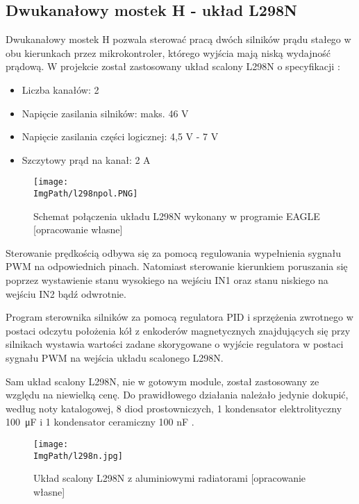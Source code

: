\documentclass[a4paper,12pt,twoside,openany]{report}
\newcommand{\ImgPath}{.}
\begin{document}
\newpage

\subsection{Dwukanałowy mostek H - układ L298N}

Dwukanałowy mostek H pozwala sterować pracą dwóch silników prądu stałego w obu kierunkach przez mikrokontroler, którego wyjścia mają niską wydajność prądową. W projekcie został zastosowany układ scalony L298N o specyfikacji \cite{l298n}:
\begin{itemize}
\item Liczba kanałów: 2
\item Napięcie zasilania silników: maks. 46 V
\item Napięcie zasilania części logicznej: 4,5 V - 7 V
\item Szczytowy prąd na kanał: 2 A
\end{itemize}

\begin{figure}[!htbp]
	\begin{center}
\centering
\texttt{[image: \\ImgPath/l298npol.PNG]}
\end{center}
	\caption{Schemat połączenia układu L298N wykonany w programie EAGLE [opracowanie własne]}
	\label{schematKomunikacji}
\end{figure}

Sterowanie prędkością odbywa się za pomocą regulowania wypełnienia sygnału PWM na odpowiednich pinach. Natomiast sterowanie kierunkiem poruszania się poprzez wystawienie stanu wysokiego na wejściu IN1 oraz stanu niskiego na wejściu IN2 bądź odwrotnie.

Program sterownika silników za pomocą regulatora PID i sprzężenia zwrotnego w postaci odczytu położenia kół z enkoderów magnetycznych znajdujących się przy silnikach wystawia wartości zadane skorygowane o wyjście regulatora w postaci sygnału PWM na wejścia układu scalonego L298N.

Sam układ scalony L298N, nie w gotowym module, został zastosowany ze względu na niewielką cenę. Do prawidłowego działania należało jedynie dokupić, według noty katalogowej, 8 diod prostowniczych, 1 kondensator elektrolityczny \SI{100}{\micro F} i 1 kondensator ceramiczny 100 nF \cite{l298n}.

\begin{figure}[!htbp]
	\begin{center}
\centering
\texttt{[image: \\ImgPath/l298n.jpg]}
\end{center}
	\caption{Układ scalony L298N z aluminiowymi radiatorami [opracowanie własne]}
	\label{schematKomunikacji}
\end{figure}
\end{document}
